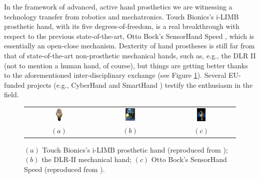 In the framework of advanced, active hand prosthetics we are
witnessing a technology transfer from robotics and mechatronics. Touch
Bionics's i-LIMB \cite{ilimb} prosthetic hand, with its five
degrees-of-freedom, is a real breakthrough with respect to the
previous state-of-the-art, Otto Bock's SensorHand Speed
\cite{sensorhand}, which is essentially an open-close
mechanism. Dexterity of hand prostheses is still far from that of
state-of-the-art non-prosthetic mechanical hands, such as, e.g., the
DLR II \cite{Hua2006} (not to mention a human hand, of course), but
things are getting better thanks to the aforementioned
inter-disciplinary exchange (see Figure \ref{fig:hands}). Several
EU-funded projects (e.g., CyberHand \cite{CyberHand} and SmartHand
\cite{smarthand}) testify the enthusiasm in the field.

\begin{figure}
  \begin{tabular}{ccc}
    \includegraphics[width=0.14\textwidth]{figs/hands_TB.jpg} &
    \includegraphics[width=0.14\textwidth]{figs/hands_DLRII.jpg} &
    \includegraphics[width=0.14\textwidth]{figs/hands_OB.jpg} \\
    $(a)$ & $(b)$ & $(c)$
  \end{tabular}
  \caption{$(a)$ Touch Bionics's i-LIMB prosthetic hand (reproduced
    from \cite{ilimb}); $(b)$ the DLR-II mechanical hand; $(c)$ Otto
    Bock's SensorHand Speed (reproduced from \cite{sensorhand}).}
  \label{fig:hands}
\end{figure}

